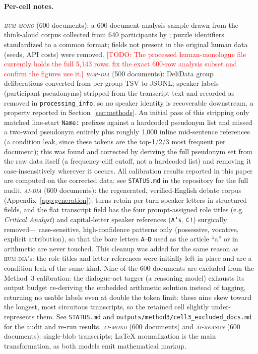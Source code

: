 \documentclass[11pt]{article}
\newcommand{\todo}[1]{\textcolor{red}{[TODO: #1]}}
\newcommand{\cellhm}{\textsc{hum-mono}}
\newcommand{\cellhd}{\textsc{hum-dia}}
\newcommand{\cellad}{\textsc{ai-dia}}
\newcommand{\cellam}{\textsc{ai-mono}}
\newcommand{\cellrt}{\textsc{ai-reason}}
\begin{document}
\paragraph{Per-cell notes.}
\emph{\cellhm{}} (600 documents): a 600-document analysis sample drawn from
the think-aloud corpus collected from 640 participants by
\citet{wurgaft2025thinkaloud}; puzzle identifiers standardized to a common
format; fields not present in the original human data (seeds, API costs) were
removed.
\todo{The processed human-monologue file currently holds the full 5{,}143 rows;
fix the exact 600-row analysis subset and confirm the figures use it.}
\emph{\cellhd{}} (500 documents): DeliData group deliberations
\citep{karadzhov2023delidata} converted from per-group TSV to JSONL; speaker
labels (participant pseudonyms) stripped from the transcript text and
recorded as removed in \texttt{processing\_info}, so no speaker identity is
recoverable downstream, a property reported in Section~\ref{sec:methods}.
An initial pass of this stripping only matched line-start \texttt{Name:}
prefixes against a hardcoded pseudonym list and missed a two-word pseudonym
entirely plus roughly 1{,}000 inline mid-sentence references (a condition
leak, since these tokens are the top-1/2/3 most frequent per document); this
was found and corrected by deriving the full pseudonym set from the raw data
itself (a frequency-cliff cutoff, not a hardcoded list) and removing it
case-insensitively wherever it occurs. All calibration results reported in
this paper are computed on the corrected data; see \texttt{STATUS.md} in the
repository for the full audit.
\emph{\cellad{}} (600 documents): the regenerated, verified-English debate
corpus (Appendix~\ref{app:generation}); turns retain per-turn speaker
letters in structured fields, and the flat transcript field has the four
prompt-assigned role titles (e.g. \emph{Critical Analyst}) and capital-letter
speaker references (\texttt{A's}, \texttt{C!}) surgically removed---%
case-sensitive, high-confidence patterns only (possessive, vocative,
explicit attribution), so that the bare letters \texttt{A}--\texttt{D} used
as the article ``a'' or in arithmetic are never touched. This cleanup was
added for the same reason as \cellhd{}'s: the role titles and letter
references were initially left in place and are a condition leak of the same
kind. Nine of the 600 documents are excluded from the Method~3 calibration:
the dialogue-act tagger (a reasoning model) exhausts its output budget
re-deriving the embedded arithmetic solution instead of tagging, returning no
usable labels even at double the token limit; these nine skew toward the
longest, most circuitous transcripts, so the retained cell slightly
under-represents them. See \texttt{STATUS.md} and
\texttt{outputs/method3/cell3\_excluded\_docs.md} for the audit and re-run
results.
\emph{\cellam{}} (600 documents) and \emph{\cellrt{}} (600 documents):
single-blob transcripts; LaTeX normalization is the main transformation, as
both models emit mathematical markup.
\end{document}

